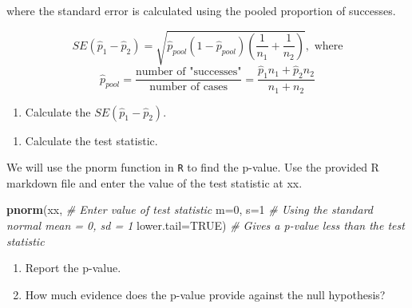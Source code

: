 \documentclass[
]{report}
\newenvironment{Shaded}{\begin{snugshade}}{\end{snugshade}}
\newcommand{\CommentTok}[1]{\textcolor[rgb]{0.56,0.35,0.01}{\textit{#1}}}
\newcommand{\DataTypeTok}[1]{\textcolor[rgb]{0.13,0.29,0.53}{#1}}
\newcommand{\DecValTok}[1]{\textcolor[rgb]{0.00,0.00,0.81}{#1}}
\newcommand{\KeywordTok}[1]{\textcolor[rgb]{0.13,0.29,0.53}{\textbf{#1}}}
\newcommand{\NormalTok}[1]{#1}
\newcommand{\OtherTok}[1]{\textcolor[rgb]{0.56,0.35,0.01}{#1}}
\providecommand{\tightlist}{%
  \setlength{\itemsep}{0pt}\setlength{\parskip}{0pt}}
\begin{document}
where the standard error is calculated using the pooled proportion of successes.

\[
SE(\hat{p}_1-\hat{p}_2)=\sqrt{\hat{p}_{pool}(1-\hat{p}_{pool})(\frac{1}{n_1}+\frac{1}{n_2})}, \text{  where}
\]
\[
\hat{p}_{pool} = \frac{\text{number of "successes"}}{\text{number of cases}} = \frac{\hat{p}_1 n_1+\hat{p}_2 n_2}{n_1+n_2}
\]

\vspace{.25in}

\begin{enumerate}
\def\labelenumi{\arabic{enumi}.}
\setcounter{enumi}{17}
\tightlist
\item
  Calculate the \(SE(\hat{p}_1-\hat{p}_2)\).
\end{enumerate}

\vspace{1in}

\begin{enumerate}
\def\labelenumi{\arabic{enumi}.}
\setcounter{enumi}{18}
\tightlist
\item
  Calculate the test statistic.
\end{enumerate}

\vspace{1in}

We will use the pnorm function in \texttt{R} to find the p-value. Use the provided R markdown file and enter the value of the test statistic at xx.

\begin{Shaded}
\begin{Highlighting}[]
\KeywordTok{pnorm}\NormalTok{(xx, }\CommentTok{\# Enter value of test statistic}
      \DataTypeTok{m=}\DecValTok{0}\NormalTok{, }\DataTypeTok{s=}\DecValTok{1} \CommentTok{\# Using the standard normal mean = 0, sd = 1}
      \DataTypeTok{lower.tail=}\OtherTok{TRUE}\NormalTok{) }\CommentTok{\# Gives a p{-}value less than the test statistic}
\end{Highlighting}
\end{Shaded}

\begin{enumerate}
\def\labelenumi{\arabic{enumi}.}
\setcounter{enumi}{19}
\item
  Report the p-value.
  \vspace{0.2in}
\item
  How much evidence does the p-value provide against the null hypothesis?
\end{enumerate}

\vspace{0.4in}
\end{document}
